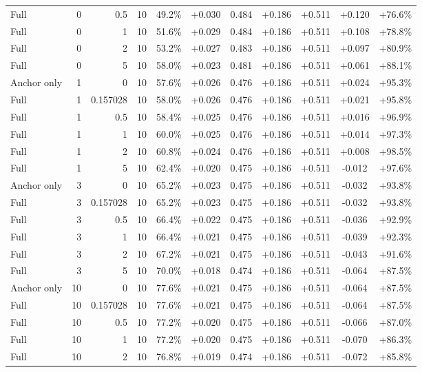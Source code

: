 \begin{table}[htbp]
\begin{tabular}{lrrrccccccc}
Full & 0 & 0.5 & 10 & 49.2\% & +0.030 & 0.484 & +0.186 & +0.511 & +0.120 & +76.6\% \\
Full & 0 & 1 & 10 & 51.6\% & +0.029 & 0.484 & +0.186 & +0.511 & +0.108 & +78.8\% \\
Full & 0 & 2 & 10 & 53.2\% & +0.027 & 0.483 & +0.186 & +0.511 & +0.097 & +80.9\% \\
Full & 0 & 5 & 10 & 58.0\% & +0.023 & 0.481 & +0.186 & +0.511 & +0.061 & +88.1\% \\
Anchor only & 1 & 0 & 10 & 57.6\% & +0.026 & 0.476 & +0.186 & +0.511 & +0.024 & +95.3\% \\
Full & 1 & 0.157028 & 10 & 58.0\% & +0.026 & 0.476 & +0.186 & +0.511 & +0.021 & +95.8\% \\
Full & 1 & 0.5 & 10 & 58.4\% & +0.025 & 0.476 & +0.186 & +0.511 & +0.016 & +96.9\% \\
Full & 1 & 1 & 10 & 60.0\% & +0.025 & 0.476 & +0.186 & +0.511 & +0.014 & +97.3\% \\
Full & 1 & 2 & 10 & 60.8\% & +0.024 & 0.476 & +0.186 & +0.511 & +0.008 & +98.5\% \\
Full & 1 & 5 & 10 & 62.4\% & +0.020 & 0.475 & +0.186 & +0.511 & -0.012 & +97.6\% \\
Anchor only & 3 & 0 & 10 & 65.2\% & +0.023 & 0.475 & +0.186 & +0.511 & -0.032 & +93.8\% \\
Full & 3 & 0.157028 & 10 & 65.2\% & +0.023 & 0.475 & +0.186 & +0.511 & -0.032 & +93.8\% \\
Full & 3 & 0.5 & 10 & 66.4\% & +0.022 & 0.475 & +0.186 & +0.511 & -0.036 & +92.9\% \\
Full & 3 & 1 & 10 & 66.4\% & +0.021 & 0.475 & +0.186 & +0.511 & -0.039 & +92.3\% \\
Full & 3 & 2 & 10 & 67.2\% & +0.021 & 0.475 & +0.186 & +0.511 & -0.043 & +91.6\% \\
Full & 3 & 5 & 10 & 70.0\% & +0.018 & 0.474 & +0.186 & +0.511 & -0.064 & +87.5\% \\
Anchor only & 10 & 0 & 10 & 77.6\% & +0.021 & 0.475 & +0.186 & +0.511 & -0.064 & +87.5\% \\
Full & 10 & 0.157028 & 10 & 77.6\% & +0.021 & 0.475 & +0.186 & +0.511 & -0.064 & +87.5\% \\
Full & 10 & 0.5 & 10 & 77.2\% & +0.020 & 0.475 & +0.186 & +0.511 & -0.066 & +87.0\% \\
Full & 10 & 1 & 10 & 77.2\% & +0.020 & 0.475 & +0.186 & +0.511 & -0.070 & +86.3\% \\
Full & 10 & 2 & 10 & 76.8\% & +0.019 & 0.474 & +0.186 & +0.511 & -0.072 & +85.8\% \\

\end{tabular}
\end{table}

